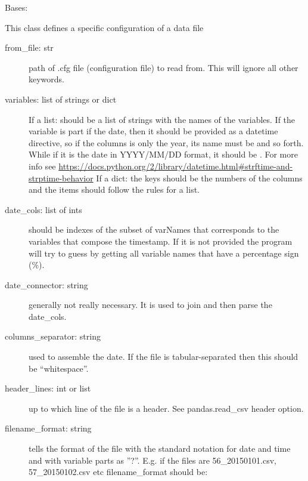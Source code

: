 \documentclass[a4paper,10pt,english]{sphinxmanual}
\begin{document}
\begin{fulllineitems}
\label{pymicra:pymicra.core.fileConfig}
Bases: 

This class defines a specific configuration of a data file
\begin{description}
\item[{from\_file: str}] \leavevmode
path of .cfg file (configuration file) to read from. This will ignore all other
keywords.

\item[{variables: list of strings or dict}] \leavevmode
If a list: should be a list of strings with the names of the variables. If the variable
is part if the date, then it should be provided as a datetime directive,
so if the columns is only the year, its name must be  and so forth. While
if it is the date in YYYY/MM/DD format, it should be . For more info
see \url{https://docs.python.org/2/library/datetime.html\#strftime-and-strptime-behavior}
If a dict: the keys should be the numbers of the columns and the items should follow
the rules for a list.

\item[{date\_cols: list of ints}] \leavevmode
should be indexes of the subset of varNames that corresponds to the variables that compose
the timestamp. If it is not provided the program will try to guess by getting
all variable names that have a percentage sign (\%).

\item[{date\_connector: string}] \leavevmode
generally not really necessary. It is used to join and then parse the date\_cols.

\item[{columns\_separator: string}] \leavevmode
used to assemble the date. If the file is tabular-separated then this should be ``whitespace''.

\item[{header\_lines: int or list}] \leavevmode
up to which line of the file is a header. See pandas.read\_csv header option.

\item[{filename\_format: string}] \leavevmode
tells the format of the file with the standard notation for date and time and with variable
parts as ''?''. E.g. if the files are 56\_20150101.csv, 57\_20150102.csv etc filename\_format should be:
\begin{quote}


\end{quote}
\end{description}
\end{fulllineitems}
\end{document}
